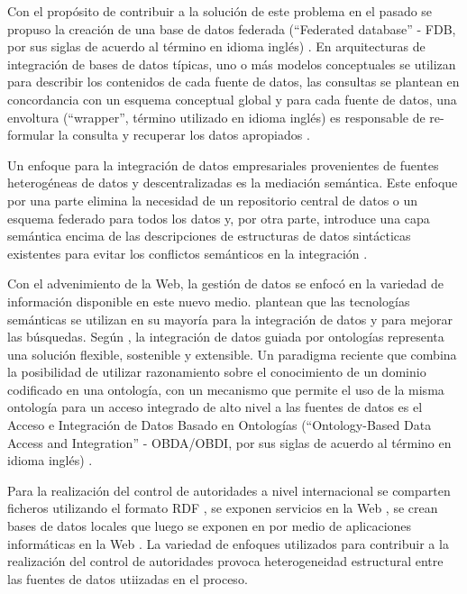 Con el propósito de contribuir a la solución de este problema en el pasado se propuso la creación de una base de datos federada (``Federated database'' - FDB, por sus siglas de acuerdo al término en idioma inglés) \citep{Sheth1990}. En arquitecturas de integración de bases de datos típicas, uno o más modelos conceptuales se utilizan para describir los contenidos de cada fuente de datos, las consultas se plantean en concordancia con un esquema conceptual global y para cada fuente de datos, una envoltura (``wrapper'', término utilizado en idioma inglés) es responsable de re-formular la consulta y recuperar los datos apropiados \citep{Spanos2012,Franke2014,ElKadiri2015}.

Un enfoque para la integración de datos empresariales provenientes de fuentes heterogéneas de datos y descentralizadas es la mediación semántica. Este enfoque por una parte elimina la necesidad de un repositorio central de datos o un esquema federado para todos los datos y, por otra parte, introduce una capa semántica encima de las descripciones de estructuras de datos sintácticas existentes para evitar los conflictos semánticos en la integración \citep{ElKadiri2015}. 

Con el advenimiento de la Web, la gestión de datos se enfocó en la variedad de información disponible en este nuevo medio. \cite{Janev2011} plantean que las tecnologías semánticas se utilizan en su mayoría para la integración de datos y para mejorar las búsquedas. Según \citep{Hoang2014}, la integración de datos guiada por ontologías representa una solución flexible, sostenible y extensible. Un paradigma reciente que combina la posibilidad de utilizar razonamiento sobre el conocimiento de un dominio codificado en una ontología, con un mecanismo que permite el uso de la misma ontología para un acceso integrado de alto nivel a las fuentes de datos es el Acceso e Integración de Datos Basado en Ontologías (``Ontology-Based Data Access and Integration'' - OBDA/OBDI, por sus siglas de acuerdo al término en idioma inglés) \citep{Calvanese2016,Calvanese2017}.

Para la realización del control de autoridades a nivel internacional se comparten ficheros utilizando el formato RDF \citep{Sandberg2016}, se exponen servicios en la Web \citep{ORCID2017}, se crean bases de datos locales que luego se exponen en por medio de aplicaciones informáticas en la Web \citep{OCLCOnlineComputerLibraryCenterInc.2014}. La variedad de enfoques utilizados para contribuir a la realización del control de autoridades provoca heterogeneidad estructural entre las fuentes de datos utiizadas en el proceso.

